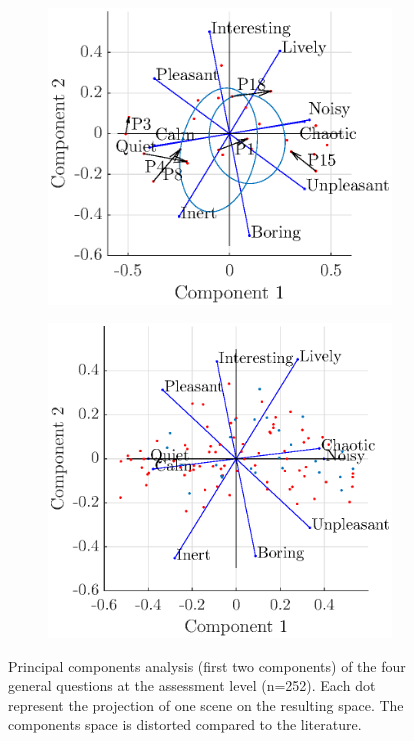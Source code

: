 \documentclass[11pt,a4paper]{article}
\begin{document}
\begin{figure}[h]
    \centering
     \begin{subfigure}[t]{0.55\textwidth}
        \centering
        \includegraphics[width=\textwidth]{figures/pca_p1.eps}
    \end{subfigure}%
    \begin{subfigure}[t]{0.5\textwidth}
        \centering
        \includegraphics[width=\textwidth]{figures/pca_sim.eps}
    \end{subfigure}
    \caption{Principal components analysis (first two components) of the four general questions at the assessment level (n=252). Each dot represent the projection of one scene on the resulting space. The components space is distorted compared to the literature.}\label{fig:pspace}
\end{figure}
\end{document}
